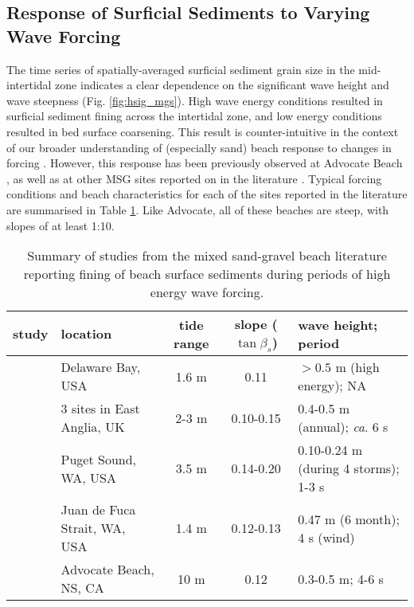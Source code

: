 \documentclass[preprint,12pt,authoryear]{elsarticle}
\begin{document}
\subsection{Response of Surficial Sediments to Varying Wave Forcing}\label{Discussion:StormFining}

The time series of spatially-averaged surficial sediment grain size in the mid-intertidal zone indicates a clear dependence on the significant wave height and wave steepness (Fig. \ref{fig:hsig_mgs}). High wave energy conditions resulted in surficial sediment fining across the intertidal zone, and low energy conditions resulted in bed surface coarsening. This result is counter-intuitive in the context of our broader understanding of (especially sand) beach response to changes in forcing \citep[e.g.,][]{Bascom1951, Masselink_etal2007}. However, this response has been previously observed at Advocate Beach \citep{Hay_etal2014}, as well as at other MSG sites reported on in the literature \citep{Nordstrom_Jackson1993, Pontee_etal2004, Curtiss_etal2009, Miller_etal2011}. Typical forcing conditions and beach characteristics for each of the sites reported in the literature are summarised in Table \ref{table:beach_summary}. Like Advocate, all of these beaches are steep, with slopes of at least 1:10.

\begin{landscape}
	\begin{table}[tbp!]
		\caption[Mixed sand-gravel beaches: summary of reported beach surface fining during storms]{Summary of studies from the mixed sand-gravel beach literature reporting fining of beach surface sediments during periods of high energy wave forcing.\label{table:beach_summary}} 
		\centering
		\begin{tabular}{llccl}
			\hline
			study & location & tide range & slope ($\tan\beta_s$) & wave height; period\\
			\hline
			\citet{Nordstrom_Jackson1993} & Delaware Bay, USA & 1.6 m & 0.11 & $>0.5$ m (high energy); NA\\
			\citet{Pontee_etal2004} & 3 sites in East Anglia, UK & 2-3 m & 0.10-0.15 & 0.4-0.5 m (annual); \textit{ca}. 6 s\\
			\citet{Curtiss_etal2009} & Puget Sound, WA, USA & 3.5 m & 0.14-0.20 & 0.10-0.24 m (during 4 storms); 1-3 s\\
			\citet{Miller_etal2011} & Juan de Fuca Strait, WA, USA & 1.4 m & 0.12-0.13 & 0.47 m (6 month); 4 s (wind)\\%
			\citet{Hay_etal2014} & Advocate Beach, NS, CA & 10 m & 0.12 & 0.3-0.5 m; 4-6 s\\
			\hline
		\end{tabular}
	\end{table}
\end{landscape}
\end{document}
